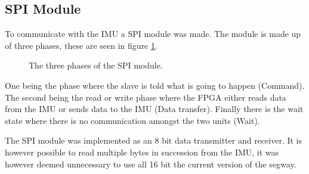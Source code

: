 \subsection{SPI Module}
To communicate with the IMU a SPI module was made.
The module is made up of three phases, these are seen in figure \ref{fig:spi_phases}.


\begin{figure}[H]
\centering


\caption{The three phases of the SPI module.}
\label{fig:spi_phases}
\end{figure}


One being the phase where the slave is told what is going to happen (Command).
The second being the read or write phase where the FPGA either reads data from the IMU or sends data to the IMU (Data transfer).
Finally there is the wait state where there is no communication amongst the two units (Wait).

The SPI module was implemented as an 8 bit data transmitter and receiver.
It is however possible to read multiple bytes in succession from the IMU, it was however deemed unnecessary to use all 16 bit the current version of the segway.